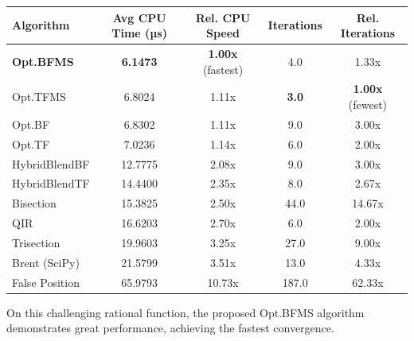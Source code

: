 \documentclass[amsmath, amssymb, aps]{revtex4-2}
\begin{document}
\begin{table}[H]
\centering
{}
\label{tab:realworld4}
\begin{tabular}{lcccc}
\hline
Algorithm              & Avg CPU Time (µs) & Rel. CPU Speed         & Iterations & Rel. Iterations        \\
\hline
\textbf{Opt.BFMS}      & \textbf{6.1473}   & \textbf{1.00x} (fastest)     & 4.0           & 1.33x                           \\
Opt.TFMS               & 6.8024            & 1.11x                        & \textbf{3.0}  & \textbf{1.00x} (fewest)         \\
Opt.BF                 & 6.8302            & 1.11x                        & 9.0           & 3.00x                           \\
Opt.TF                 & 7.0236            & 1.14x                        & 6.0           & 2.00x                           \\
HybridBlendBF          & 12.7775           & 2.08x                        & 9.0           & 3.00x                           \\
HybridBlendTF          & 14.4400           & 2.35x                        & 8.0           & 2.67x                           \\
Bisection              & 15.3825           & 2.50x                        & 44.0          & 14.67x                          \\
QIR                    & 16.6203           & 2.70x                        & 6.0           & 2.00x                           \\
Trisection             & 19.9603           & 3.25x                        & 27.0          & 9.00x                           \\
Brent (SciPy)          & 21.5799           & 3.51x                        & 13.0          & 4.33x                           \\
False Position         & 65.9793           & 10.73x                       & 187.0         & 62.33x                          \\
\hline
\end{tabular}
\end{table}
\FloatBarrier

On this challenging rational function, the proposed Opt.BFMS algorithm demonstrates great performance, achieving the fastest convergence.
\end{document}
